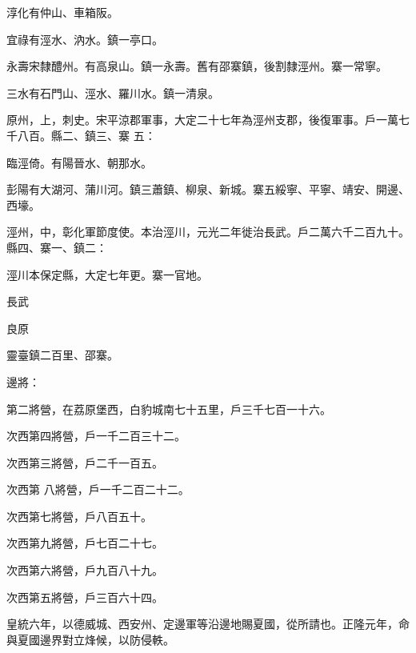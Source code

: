 \begin{pinyinscope}
 淳化有仲山、車箱阪。



 宜祿有涇水、汭水。鎮一亭口。



 永壽宋隸醴州。有高泉山。鎮一永壽。舊有邵寨鎮，後割隸涇州。寨一常寧。



 三水有石門山、涇水、羅川水。鎮一清泉。



 原州，上，刺史。宋平涼郡軍事，大定二十七年為涇州支郡，後復軍事。戶一萬七千八百。縣二、鎮三、寨
 五：



 臨涇倚。有陽晉水、朝那水。



 彭陽有大湖河、蒲川河。鎮三蕭鎮、柳泉、新城。寨五綏寧、平寧、靖安、開邊、西壕。



 涇州，中，彰化軍節度使。本治涇川，元光二年徙治長武。戶二萬六千二百九十。縣四、寨一、鎮二：



 涇川本保定縣，大定七年更。寨一官地。



 長武



 良原



 靈臺鎮二百里、邵寨。



 邊將：



 第二將營，在荔原堡西，白豹城南七十五里，戶三千七百一十六。



 次西第四將營，戶一千二百三十二。



 次西第三將營，戶二千一百五。



 次西第
 八將營，戶一千二百二十二。



 次西第七將營，戶八百五十。



 次西第九將營，戶七百二十七。



 次西第六將營，戶九百八十九。



 次西第五將營，戶三百六十四。



 皇統六年，以德威城、西安州、定邊軍等沿邊地賜夏國，從所請也。正隆元年，命與夏國邊界對立烽候，以防侵軼。




\end{pinyinscope}
